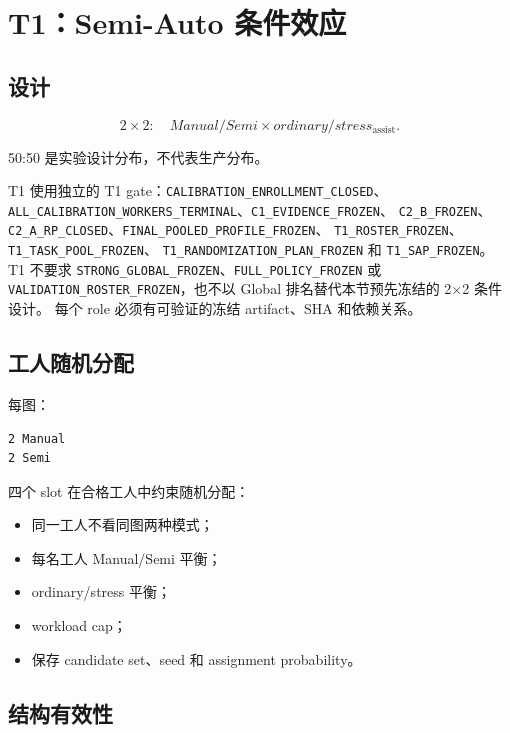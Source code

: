 \section{T1：Semi-Auto 条件效应}

\subsection{设计}

\[
2\times2:
\quad
Manual/Semi
\times
ordinary/stress_{\text{assist}}.
\]

50:50 是实验设计分布，不代表生产分布。

T1 使用独立的 T1 gate：\texttt{CALIBRATION\_ENROLLMENT\_CLOSED}、
\texttt{ALL\_CALIBRATION\_WORKERS\_TERMINAL}、\texttt{C1\_EVIDENCE\_FROZEN}、
\texttt{C2\_B\_FROZEN}、\texttt{C2\_A\_RP\_CLOSED}、\texttt{FINAL\_POOLED\_PROFILE\_FROZEN}、
\texttt{T1\_ROSTER\_FROZEN}、\texttt{T1\_TASK\_POOL\_FROZEN}、
\texttt{T1\_RANDOMIZATION\_PLAN\_FROZEN} 和 \texttt{T1\_SAP\_FROZEN}。
T1 不要求 \texttt{STRONG\_GLOBAL\_FROZEN}、\texttt{FULL\_POLICY\_FROZEN} 或
\texttt{VALIDATION\_ROSTER\_FROZEN}，也不以 Global 排名替代本节预先冻结的 2$\times$2 条件设计。
每个 role 必须有可验证的冻结 artifact、SHA 和依赖关系。

\subsection{工人随机分配}

每图：

\begin{verbatim}
2 Manual
2 Semi
\end{verbatim}

四个 slot 在合格工人中约束随机分配：

\begin{itemize}
  \item 同一工人不看同图两种模式；
  \item 每名工人 Manual/Semi 平衡；
  \item ordinary/stress 平衡；
  \item workload cap；
  \item 保存 candidate set、seed 和 assignment probability。
\end{itemize}

\subsection{结构有效性}

